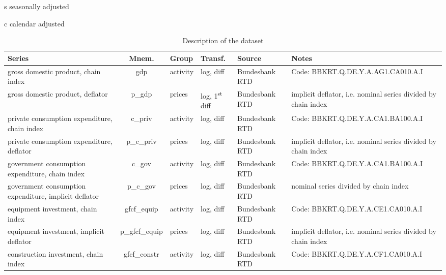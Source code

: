 \documentclass[notitlepage,a4paper,12pt]{article}
\begin{document}
\begingroup\fontsize{6}{8}\selectfont
\begin{ThreePartTable}
    \begin{TableNotes}
    \item[s] seasonally adjusted
    \item[c] calendar adjusted
    \end{TableNotes}
\begin{landscape}
\begin{longtable}{| l | c | l | l | l | l |} 
    \caption{Description of the dataset} \\%
    \toprule
    \rowcolor{gray!50}
    \textbf{Series} & \textbf{Mnem.} &  \textbf{Group} & \textbf{Transf.} & \textbf{Source} & \textbf{Notes} \\
    \midrule
    gross domestic product, chain index\tnote{s,c} & gdp &  activity & log, diff  & Bundesbank RTD & Code: BBKRT.Q.DE.Y.A.AG1.CA010.A.I  \\ \hline 
    gross domestic product, deflator\tnote{s,c} & p\_gdp &  prices &  log, 1\textsuperscript{st} diff  & Bundesbank RTD & implicit deflator, i.e. nominal series divided by chain index  \\ \hline 
    private consumption expenditure, chain index\tnote{s,c} & c\_priv &  activity &  log, diff  & Bundesbank RTD & Code: BBKRT.Q.DE.Y.A.CA1.BA100.A.I  \\ \hline 
    private consumption expenditure, deflator\tnote{s,c} & p\_c\_priv &  prices &  log, diff  & Bundesbank RTD & implicit deflator, i.e. nominal series divided by chain index  \\ \hline 
    government consumption expenditure, chain index\tnote{s,c} & c\_gov &  activity &  log, diff  & Bundesbank RTD & Code: BBKRT.Q.DE.Y.A.CA1.BA100.A.I  \\ \hline 
    government consumption expenditure, implicit deflator\tnote{s,c} & p\_c\_gov &  prices &  log, diff  & Bundesbank RTD & nominal series divided by chain index  \\ \hline
    equipment investment, chain index\tnote{s,c} & gfcf\_equip & activity & log, diff  & Bundesbank RTD & Code: BBKRT.Q.DE.Y.A.CE1.CA010.A.I\\ \hline
    equipment investment, implicit deflator\tnote{s,c} & p\_gfcf\_equip & prices & log, diff  & Bundesbank RTD & implicit deflator, i.e. nominal series divided by chain index\\ \hline
    construction investment, chain index\tnote{s,c} & gfcf\_constr & activity & log, diff  & Bundesbank RTD & Code: BBKRT.Q.DE.Y.A.CF1.CA010.A.I\\ \hline

\end{longtable}
\end{landscape}
\end{ThreePartTable}
\end{document}
